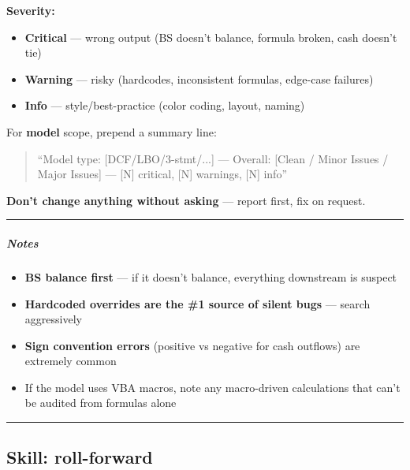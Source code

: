 \documentclass[11pt]{article}
\begin{document}
\textbf{Severity:}

\begin{itemize}[leftmargin=*,itemsep=2pt,topsep=2pt]
\item {} \textbf{Critical} — wrong output (BS doesn't balance, formula broken, cash doesn't tie)
\item {} \textbf{Warning} — risky (hardcodes, inconsistent formulas, edge-case failures)
\item {} \textbf{Info} — style/best-practice (color coding, layout, naming)
\end{itemize}

For \textbf{model} scope, prepend a summary line:


\begin{quote}
``Model type: [DCF/LBO/3-stmt/...] — Overall: [Clean / Minor Issues / Major Issues] — [N] critical, [N] warnings, [N] info''
\end{quote}

\textbf{Don't change anything without asking} — report first, fix on request.


\vspace{0.5em}\hrule\vspace{0.5em}

\subparagraph{Notes}\mbox{}\par

\begin{itemize}[leftmargin=*,itemsep=2pt,topsep=2pt]
\item {} \textbf{BS balance first} — if it doesn't balance, everything downstream is suspect
\item {} \textbf{Hardcoded overrides are the \#1 source of silent bugs} — search aggressively
\item {} \textbf{Sign convention errors} (positive vs negative for cash outflows) are extremely common
\item {} If the model uses VBA macros, note any macro-driven calculations that can't be audited from formulas alone
\end{itemize}

\vspace{0.8em}\hrule\vspace{0.8em}

\subsection{Skill: roll-forward}\label{file:month-end-closer-skills-roll-forward-SKILL-md}
\end{document}
